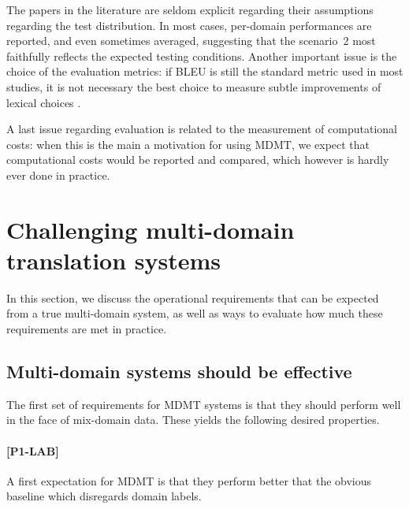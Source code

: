 \documentclass[11pt]{article}
\newcommand{\fyTodo}[1]{\Todo[FY:]{\textcolor{orange}{#1}}}
\begin{document}
The papers in the literature are seldom explicit regarding their assumptions regarding the test distribution. In most cases, per-domain performances are reported, and even sometimes averaged, suggesting that the scenario~2 most faithfully reflects the expected testing conditions. Another important issue is the choice of the evaluation metrics: if BLEU is still the standard metric used in most studies, it is not necessary the best choice to measure subtle improvements of lexical choices \cite{Irvine13measuring}.

A last issue regarding evaluation is related to the measurement of computational costs: when this is the main a motivation for using MDMT, we expect that computational costs would be reported and compared, which however is hardly ever done in practice. \fyTodo{Keep this ?}

\section{Challenging multi-domain translation systems}
In this section, we discuss the operational requirements that can be expected from a true multi-domain system, as well as ways to evaluate how much these requirements are met in practice.

\subsection{Multi-domain systems should be effective \label{ssec:effective}}
The first set of requirements for MDMT systems is that they should perform well in the face of mix-domain data. These yields the following desired properties.

\paragraph{[P1-LAB]}\fyTodo{Decide naming scheme} A first expectation for MDMT is that they perform better that the obvious baseline which disregards domain labels. %
\end{document}
